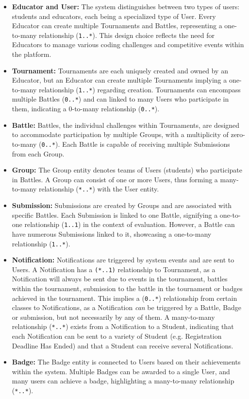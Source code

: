\begin{itemize}
    \item \textbf{Educator and User:} The system distinguishes between two types of users: students and educators, each being a specialized type of User. Every Educator can create multiple Tournaments and Battles, representing a one-to-many relationship (\texttt{1..*}). This design choice reflects the need for Educators to manage various coding challenges and competitive events within the platform.  

    \item \textbf{Tournament:} Tournaments are each uniquely created and owned by an Educator, but an Educator can create multiple Tournaments implying a one-to-many relationship (\texttt{1..*}) regarding creation. Tournaments can encompass multiple Battles (\texttt{0..*}) and can linked to many Users who participate in them, indicating a 0-to-many relationship (\texttt{0..*}). 

    \item \textbf{Battle:} Battles, the individual challenges within Tournaments, are designed to accommodate participation by multiple Groups, with a multiplicity of zero-to-many (\texttt{0..*}). Each Battle is capable of receiving multiple Submissions from each Group.

    \item \textbf{Group:} The Group entity denotes teams of Users (students) who participate in Battles. A Group can consist of one or more Users, thus forming a many-to-many relationship (\texttt{*..*}) with the User entity. 
    
    \item \textbf{Submission:} Submissions are created by Groups and are associated with specific Battles. Each Submission is linked to one Battle, signifying a one-to-one relationship (\texttt{1..1}) in the context of evaluation. However, a Battle can have numerous Submissions linked to it, showcasing a one-to-many relationship (\texttt{1..*}).

    \item \textbf{Notification:} Notifications are triggered by system events and are sent to Users. A Notification has a \texttt{(*..1)}  relationship to Tournament, as a Notification will always be sent due to events in the tournament, battles within the tournament, submission to the battle in the tournament or badges achieved in the tournament. This implies a (\texttt{0..*}) relationship from certain classes to Notifications, as a Notification \textit{can} be triggered by a Battle, Badge or submission, but not necessarily by any of them.  A many-to-many relationship (\texttt{*..*}) exists from a Notification to a Student, indicating that each Notification can be sent to a variety of Student (e.g. Registration Deadline Has Ended) and that a Student can receive several Notifications.

    \item \textbf{Badge:} The Badge entity is connected to Users based on their achievements within the system. Multiple Badges can be awarded to a single User, and many users can achieve a badge, highlighting a many-to-many relationship (\texttt{*..*}).
\end{itemize}

